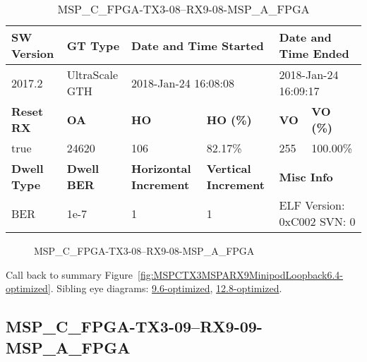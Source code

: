 \begin{table}[h]
\centering
\caption{MSP\_C\_FPGA-TX3-08--RX9-08-MSP\_A\_FPGA}
\label{tab:MSPCFPGATX308RX908MSPAFPGA6.4-optimized}
\begin{tabular}{@{}|l|l|l|l|l|l|@{}}
\toprule
\textbf{SW Version}                & \textbf{GT Type}   & \multicolumn{2}{l|}{\textbf{Date and Time Started}}            & \multicolumn{2}{l|}{\textbf{Date and Time Ended}}        \\ \midrule
2017.2                       & UltraScale GTH          & \multicolumn{2}{l|}{2018-Jan-24 16:08:08}                   & \multicolumn{2}{l|}{2018-Jan-24 16:09:17}               \\ \midrule
\textbf{Reset RX}                  & \textbf{OA} & \textbf{HO}   & \textbf{HO (\%)} & \textbf{VO} & \textbf{VO (\%)} \\ \midrule
true & 24620        & 106          & 82.17\%        & 255        & 100.00\%       \\ \midrule
\textbf{Dwell Type}                & \textbf{Dwell BER} & \textbf{Horizontal Increment} & \textbf{Vertical Increment}    & \multicolumn{2}{l|}{\textbf{Misc Info}}                  \\ \midrule
BER                            & 1e-7        & 1        & 1           & \multicolumn{2}{l|}{ELF Version: 0xC002 SVN: 0}                         \\ \bottomrule
\end{tabular}
\end{table}

\begin{figure}[h]
\caption{MSP\_C\_FPGA-TX3-08--RX9-08-MSP\_A\_FPGA} \label{fig:MSPCFPGATX308RX908MSPAFPGA6.4-optimized}
\end{figure}

Call back to summary Figure~\ref{fig:MSPCTX3MSPARX9MinipodLoopback6.4-optimized}.
Sibling eye diagrams: \hyperref[sec:MSPCFPGATX308RX908MSPAFPGA9.6-optimized]{9.6-optimized}, \hyperref[sec:MSPCFPGATX308RX908MSPAFPGA12.8-optimized]{12.8-optimized}.

\clearpage
\newpage


\subsection{MSP\_C\_FPGA-TX3-09--RX9-09-MSP\_A\_FPGA}\label{sec:MSPCFPGATX309RX909MSPAFPGA6.4-optimized}

